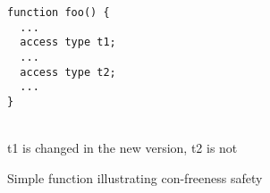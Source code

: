 \begin{figure}[t]
\centering
\begin{minipage}{0.3\textwidth}%
\begin{lstlisting}[frame=single]
function foo() {
  ...
  access type t1;
  ...
  access type t2;
  ...
}
\end{lstlisting}
\end{minipage}%
\\
t1 is changed in the new version, t2 is not
\caption{Simple function illustrating con-freeness safety}
\label{fig:con-freeness}
\end{figure}
